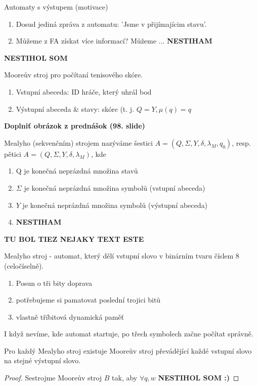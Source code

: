 \documentclass[../main.tex]{subfiles}
\begin{document}
Automaty s výstupem (motivace)\\

\begin{enumerate}
    \item Dosud jediná zpráva z automatu: 'Jsme v přijímajícim stavu'.
    \item Můžeme z FA získat více informací? Můžeme ... \textbf{NESTIHAM}
\end{enumerate}

\begin{definition}
    \textbf{NESTIHOL SOM}
\end{definition}

\begin{example}
    Mooreův stroj pro počítaní tenisového skóre.
    \begin{enumerate}
        \item Vstupní abeceda: ID hráče, který uhrál bod
        \item Výstupní abeceda $\&$ stavy: skóre (t. j. $Q = Y, \mu(q) = q$
    \end{enumerate}
    \textbf{Doplniť obrázok z prednášok (98. slide)}
\end{example}

\begin{definition}
    Mealyho (sekvenčním) strojem nazýváme šestici $A = (Q,\Sigma, Y, \delta, \lambda_M, q_0 )$, resp.
    pětici $A = (Q,\Sigma, Y, \delta, \lambda_M)$, kde
    \begin{enumerate}
        \item Q je konečná neprázdná množina stavů
        \item $\Sigma$ je konečná neprázdná množina symbolů (vstupní abeceda)
        \item $Y$ je konečná neprázdná množina symbolů (výstupní abeceda)
        \item \textbf{NESTIHAM}
    \end{enumerate}
    \textbf{TU BOL TIEZ NEJAKY TEXT ESTE}
\end{definition}

\begin{example}
    Mealyho stroj - automat, který dělí vstupní slovo v binárním tvaru číslem 8 (celočíselně).
    \begin{enumerate}
        \item Posun o tři bity doprava
        \item potřebujeme si pamatovat poslední trojici bitů
        \item vlastně tříbitová dynamická paměť
    \end{enumerate}
    I když nevíme, kde automat startuje, po třech symbolech začne počítat správně.
\end{example}

\begin{theorem}
    Pro každý Mealyho stroj existuje Mooreův stroj převádějící každé vstupní slovo na stejné výstupní slovo.
\end{theorem}
\begin{proof}
    Sestrojme Mooreův stroj $B$ tak, aby $\forall q,w$ \textbf{NESTIHOL SOM :)}
\end{proof}
\end{document}
